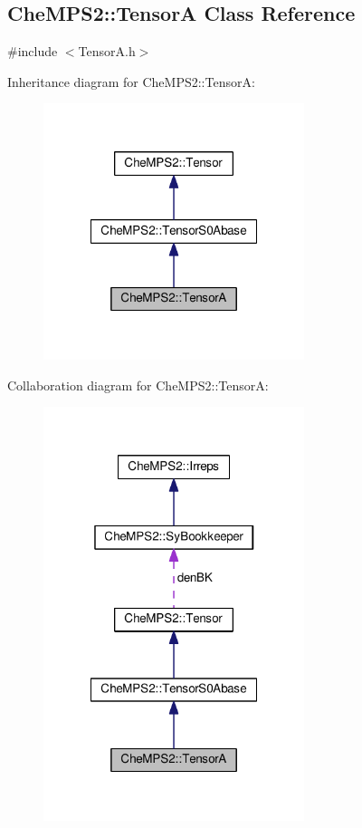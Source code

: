 \hypertarget{classCheMPS2_1_1TensorA}{\subsection{Che\-M\-P\-S2\-:\-:Tensor\-A Class Reference}
\label{classCheMPS2_1_1TensorA}
}


{\ttfamily \#include $<$Tensor\-A.\-h$>$}



Inheritance diagram for Che\-M\-P\-S2\-:\-:Tensor\-A\-:\nopagebreak
\begin{figure}[H]
\begin{center}
\leavevmode
\includegraphics[width=216pt]{classCheMPS2_1_1TensorA__inherit__graph}
\end{center}
\end{figure}


Collaboration diagram for Che\-M\-P\-S2\-:\-:Tensor\-A\-:\nopagebreak
\begin{figure}[H]
\begin{center}
\leavevmode
\includegraphics[width=216pt]{classCheMPS2_1_1TensorA__coll__graph}
\end{center}
\end{figure}
